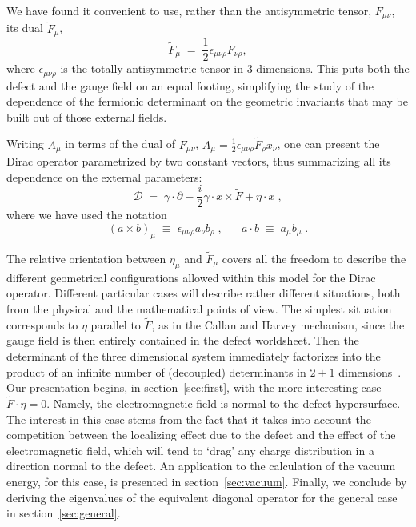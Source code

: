 \documentclass[a4paper,12pt]{article}
\newcommand{\Fd}{\widetilde{F}}
\newcommand{\n}{\eta}
\begin{document}
We have found it convenient to use, rather than the antisymmetric
tensor, $F_{\mu\nu}$, its dual $\Fd_\mu$,
\begin{equation}\label{Fd}
\Fd_\mu\;=\;\frac{1}{2}\epsilon_{\mu\nu\rho}F_{\nu\rho},
\end{equation}
where $\epsilon_{\mu\nu\rho}$ is the totally antisymmetric tensor in $3$ dimensions.
This puts both the defect and the gauge field on an equal footing,
simplifying the study of the dependence of the fermionic determinant
on the geometric invariants that may be built out of those external
fields.

Writing $A_\mu$ in terms of the dual of $F_{\mu\nu}$, $A_\mu=\frac{1}{2}
\epsilon_{\mu\nu\rho} \Fd_\rho x_\nu$, one can present the Dirac operator parametrized by
two constant vectors, thus summarizing all its dependence on the
external parameters:
\begin{equation}\label{D}
{\mathcal D}\;=\;\gamma \cdot \partial - \frac{i}{2} \gamma \cdot x \times \Fd + \n \cdot x \;,
\end{equation}
where we have used the notation
\begin{equation}\label{productos}
(a \times b)_\mu \;\equiv\; \epsilon_{\mu\nu\rho} a_\nu b_\rho\; ,
\;\;\;\;\;\;  a \cdot b\;\equiv\;a_\mu b_\mu \;.
\end{equation}

The relative orientation between $\n_\mu$ and $\Fd_\mu$ covers all the
freedom to describe the different geometrical configurations allowed
within this model for the Dirac operator. Different particular cases
will describe rather different situations, both from the physical and
the mathematical points of view. The simplest situation corresponds to
$\eta$ parallel to ${\tilde F}$, as in the Callan and Harvey mechanism,
since the gauge field is then entirely contained in the defect
worldsheet. Then the determinant of the three dimensional system
immediately factorizes into the product of an infinite number of
(decoupled) determinants in $2+1$ dimensions~\cite{paper2+1}.  Our
presentation begins, in section~\ref{sec:first}, with the more
interesting case $\Fd \cdot \n=0$.  Namely, the electromagnetic field is
normal to the defect hypersurface.  The interest in this case stems
from the fact that it takes into account the competition between the
localizing effect due to the defect and the effect of the
electromagnetic field, which will tend to `drag' any charge
distribution in a direction normal to the defect.  An application to
the calculation of the vacuum energy, for this case, is presented in
section~\ref{sec:vacuum}.  Finally, we conclude by deriving the
eigenvalues of the equivalent diagonal operator for the general case
in section~\ref{sec:general}.
\end{document}
